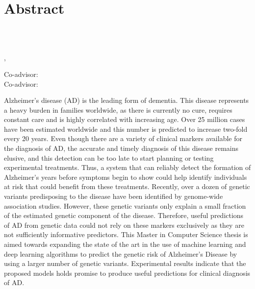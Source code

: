 \chapter*{Abstract} \label{abstract}

\begin{center}\large
    \textbf{\thesisTitle}\\
\end{center}

\begin{center}
\end{center}

\begin{center}
    \authorName\\
    \schoolName, \thesisYear\\
\end{center}

\begin{center}
    Co-advisor: \firstAdvisorName\\
    Co-advisor: \secondAdvisorName\\
\end{center}


\begin{center}
\end{center}






Alzheimer's disease (AD) is the leading form of dementia. This disease represents a heavy burden in families worldwide, as there is currently no cure, requires constant care and is highly correlated with increasing age. Over 25 million cases have been estimated worldwide and this number is predicted to increase two-fold every 20 years. Even though there are a variety of clinical markers available for the diagnosis of AD, the accurate and timely diagnosis of this disease remains elusive, and this detection can be too late to start planning or testing experimental treatments. Thus, a system that can reliably detect the formation of Alzheimer's years before symptoms begin to show could help identify individuals at risk that could benefit from these treatments. Recently, over a dozen of genetic variants predisposing to the disease have been identified by genome-wide association studies. However, these genetic variants only explain a small fraction of the estimated genetic component of the disease. Therefore, useful predictions of AD from genetic data could not rely on these markers exclusively as they are not sufficiently informative predictors. This Master in Computer Science thesis is aimed towards expanding the state of the art in the use of machine learning and deep learning algorithms to predict the genetic risk of Alzheimer's Disease by using a larger number of genetic variants. Experimental results indicate that the proposed models holds promise to produce useful predictions for clinical diagnosis of AD.

